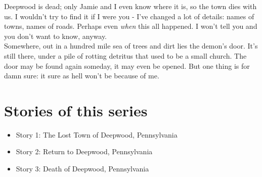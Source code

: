 \documentclass[a5paper]{scrartcl}
\begin{document}
Deepwood is dead; only Jamie and I even know where it is, so the town dies with us. I wouldn't try to find it if I were you - I've changed a lot of details: names of towns, names of roads. Perhaps even \textit{when}
 this all happened. I won't tell you and you don't want to know, anyway.\\


Somewhere, out in a hundred mile sea of trees and dirt lies the demon's door. It's still there, under a pile of rotting detritus that used to be a small church. The door may be found again someday, it may even be opened. But one thing is for damn sure: it sure as hell won't be because of me.

\clearpage
\section*{Stories of this series}

\begin{itemize}
    \item Story 1: The Lost Town of Deepwood, Pennsylvania
    \item Story 2: Return to Deepwood, Pennsylvania
    \item Story 3: Death of Deepwood, Pennsylvania
\end{itemize}
\end{document}
